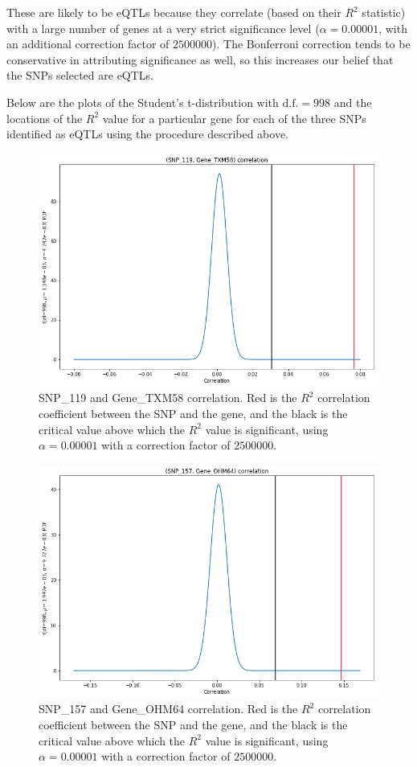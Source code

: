\documentclass{article}[11pt]
\begin{document}
These are likely to be eQTLs because they correlate 
(based on their $R^2$ statistic)
with a large number of genes at a very strict
significance level ($\alpha=0.00001$, with an
additional correction factor of $2500000$). The Bonferroni
correction tends to be conservative in attributing
significance as well, so this increases our belief
that the SNPs selected are eQTLs.

Below are the plots of the Student's t-distribution
with $\text{d.f.}=998$ and the locations
of the $R^2$ value for a particular gene for each of the
three SNPs identified as eQTLs using the procedure described
above.

\begin{figure}[H]
\includegraphics[width=\textwidth]{./imgs/snp_119.png}
\caption{SNP\_119 and Gene\_TXM58 correlation.
Red is the $R^2$ correlation coefficient between the SNP
and the gene, and the black is the critical value above which
the $R^2$ value is significant, using $\alpha=0.00001$ with
a correction factor of $2500000$.}
\end{figure}

\begin{figure}[H]
\includegraphics[width=\textwidth]{./imgs/snp_157.png}
\caption{SNP\_157 and Gene\_OHM64 correlation.
Red is the $R^2$ correlation coefficient between the SNP
and the gene, and the black is the critical value above which
the $R^2$ value is significant, using $\alpha=0.00001$ with
a correction factor of $2500000$.}
\end{figure}
\end{document}
